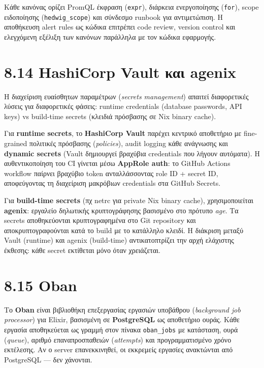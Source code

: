 Κάθε κανόνας ορίζει PromQL έκφραση (\texttt{expr}), διάρκεια
ενεργοποίησης (\texttt{for}), scope ειδοποίησης (\texttt{hedwig\_scope})
και σύνδεσμο runbook για αντιμετώπιση. Η αποθήκευση alert rules ως
κώδικα επιτρέπει code review, version control και ελεγχόμενη εξέλιξη των
κανόνων παράλληλα με τον κώδικα εφαρμογής.

\section{8.14 HashiCorp Vault και
agenix}\label{hashicorp-vault-ux3baux3b1ux3b9-agenix}

Η διαχείριση ευαίσθητων παραμέτρων (\emph{secrets management}) απαιτεί
διαφορετικές λύσεις για διαφορετικές φάσεις: runtime credentials
(database passwords, API keys) vs build-time secrets (κλειδιά πρόσβασης
σε Nix binary cache).

Για \textbf{runtime secrets}, το \textbf{HashiCorp Vault} παρέχει
κεντρικό αποθετήριο με fine-grained πολιτικές πρόσβασης
(\emph{policies}), audit logging κάθε ανάγνωσης και \textbf{dynamic
secrets} (Vault δημιουργεί βραχύβια credentials που λήγουν αυτόματα). Η
αυθεντικοποίηση του CI γίνεται μέσω \textbf{AppRole auth}: το GitHub
Actions workflow παίρνει βραχύβιο token ανταλλάσσοντας role ID + secret
ID, αποφεύγοντας τη διαχείριση μακρόβιων credentials στα GitHub Secrets.

Για \textbf{build-time secrets} (πχ netrc για private Nix binary cache),
χρησιμοποιείται \textbf{agenix}: εργαλείο δηλωτικής κρυπτογράφησης
βασισμένο στο πρότυπο \emph{age}. Τα secrets αποθηκεύονται
κρυπτογραφημένα στο Git repository και αποκρυπτογραφούνται κατά το build
με το κατάλληλο κλειδί. Η διάκριση μεταξύ Vault (runtime) και agenix
(build-time) αντικατοπτρίζει την αρχή ελάχιστης έκθεσης: κάθε secret
εκτίθεται μόνο όταν χρειάζεται.

\section{8.15 Oban}\label{oban}

Το \textbf{Oban} είναι βιβλιοθήκη επεξεργασίας εργασιών υποβάθρου
(\emph{background job processor}) για Elixir, βασισμένη σε
\textbf{PostgreSQL} ως αποθετήριο ουράς. Κάθε εργασία αποθηκεύεται ως
γραμμή στον πίνακα \texttt{oban\_jobs} με κατάσταση, ουρά
(\emph{queue}), αριθμό επαναπροσπαθειών (\emph{attempts}) και
προγραμματισμένο χρόνο εκτέλεσης. Αν ο server επανεκκινηθεί, οι
εκκρεμείς εργασίες ανακτώνται από PostgreSQL --- δεν χάνονται.

